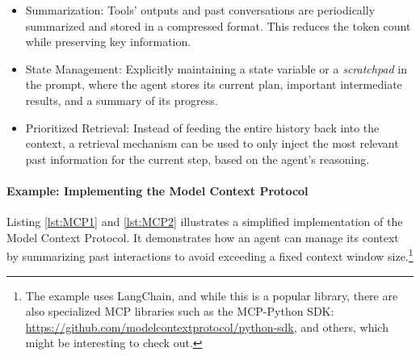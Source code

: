 \begin{itemize}
    \item Summarization: Tools' outputs and past conversations are periodically summarized and stored in a compressed format. This reduces the token count while preserving key information.
    \item State Management: Explicitly maintaining a state variable or a {\em scratchpad} in the prompt, where the agent stores its current plan, important intermediate results, and a summary of its progress.
    \item Prioritized Retrieval: Instead of feeding the entire history back into the context, a retrieval mechanism can be used to only inject the most relevant past information for the current step, based on the agent's reasoning.
\end{itemize}


\paragraph{Example: Implementing the Model Context Protocol}
Listing \ref{lst:MCP1} and \ref{lst:MCP2} illustrates a simplified implementation of the Model Context Protocol. It demonstrates how an agent can manage its context by summarizing past interactions to avoid exceeding a fixed context window size.\footnote{The example uses LangChain, and while this is a popular library, there are also specialized MCP libraries such as the MCP-Python SDK: \url{https://github.com/modelcontextprotocol/python-sdk}, and others, which might be interesting to check out.}


